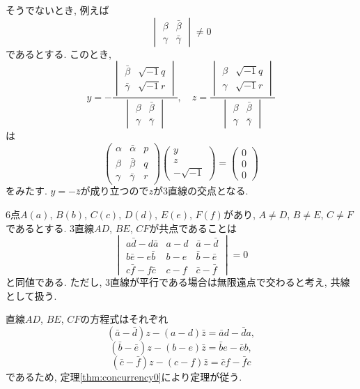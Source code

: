 \begin{prf*}
そうでないとき, 例えば
\[\begin{vmatrix}\beta&\bar\beta\\\gamma&\bar\gamma\end{vmatrix}\neq 0\]
であるとする.
このとき,
\[
y=-\frac{\begin{vmatrix}\bar\beta&\sqrt{-1}q\\\bar\gamma&\sqrt{-1}r\end{vmatrix}}{\begin{vmatrix}\beta&\bar\beta\\\gamma&\bar\gamma\end{vmatrix}},\quad
z=\frac{\begin{vmatrix}\beta&\sqrt{-1}q\\\gamma&\sqrt{-1}r\end{vmatrix}}{\begin{vmatrix}\beta&\bar\beta\\\gamma&\bar\gamma\end{vmatrix}}
\]
は
\[
\begin{pmatrix}\alpha&\bar\alpha&p\\\beta&\bar\beta&q\\\gamma&\bar\gamma&r\end{pmatrix}
\begin{pmatrix}y\\z\\-\sqrt{-1}\end{pmatrix}
=\begin{pmatrix}0\\0\\0\end{pmatrix}
\]
をみたす.
$y=-\bar z$が成り立つので$z$が$3$直線の交点となる.
\end{prf*}
%
%
\begin{bthm}\label{thm:concurrency1}
$6$点$A(a)$, $B(b)$, $C(c)$, $D(d)$, $E(e)$, $F(f)$があり, $A\neq D$, $B\neq E$, $C\neq F$であるとする.
$3$直線$AD$, $BE$, $CF$が共点であることは
\[
\begin{vmatrix}a\bar{d}-d\bar{a}&a-d&\bar{a}-\bar{d}\\b\bar{e}-e\bar{b}&b-e&\bar{b}-\bar{e}\\c\bar{f}-f\bar{c}&c-f&\bar{c}-\bar{f}\end{vmatrix}=0
\]
と同値である.
ただし, $3$直線が平行である場合は無限遠点で交わると考え, 共線として扱う.
\end{bthm}
\begin{prf*}
直線$AD$, $BE$, $CF$の方程式はそれぞれ
\[(\bar a-\bar d)z-(a-d)\bar z=\bar ad-\bar da,\]
\[(\bar b-\bar e)z-(b-e)\bar z=\bar be-\bar eb,\]
\[(\bar c-\bar f)z-(c-f)\bar z=\bar cf-\bar fc\]
であるため, 定理\ref{thm:concurrency0}により定理が従う.
\end{prf*}
